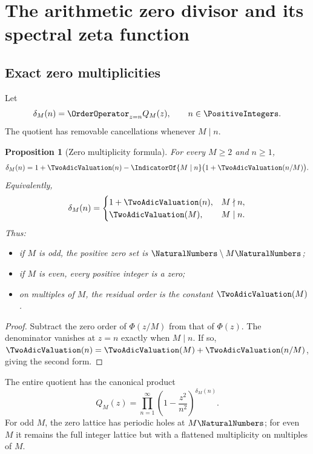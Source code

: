 \documentclass[11pt,oneside]{article}
\newtheorem{proposition}[theorem]{Proposition}
\theoremstyle{definition}
\theoremstyle{remark}
\begin{document}
\section{The arithmetic zero divisor and its spectral zeta function}
\label{sec:zeros}

\subsection{Exact zero multiplicities}

Let
\begin{equation}
 \delta_M(n)=\OrderOperator_{z=n}Q_M(z),
 \qquad n\in\PositiveIntegers.
 \label{eq:deltaM-def}
\end{equation}
The quotient has removable cancellations whenever $M\mid n$.

\begin{proposition}[Zero multiplicity formula]
\label{prop:zero-multiplicity}
For every $M\ge2$ and $n\ge1$,
\begin{equation}
 \delta_M(n)
 =1+\TwoAdicValuation(n)-\IndicatorOf{M\mid n}
 \bigl(1+\TwoAdicValuation(n/M)\bigr).
 \label{eq:deltaM-general}
\end{equation}
Equivalently,
\begin{equation}
 \delta_M(n)=
 \begin{cases}
 1+\TwoAdicValuation(n),&M\nmid n,\\
 \TwoAdicValuation(M),&M\mid n.
 \end{cases}
 \label{eq:deltaM-cases}
\end{equation}
Thus:
\begin{itemize}
\item if $M$ is odd, the positive zero set is $\NaturalNumbers\setminus M\NaturalNumbers$;
\item if $M$ is even, every positive integer is a zero;
\item on multiples of $M$, the residual order is the constant $\TwoAdicValuation(M)$.
\end{itemize}
\end{proposition}

\begin{proof}
Subtract the zero order of $\Phi(z/M)$ from that of $\Phi(z)$.  The denominator vanishes
at $z=n$ exactly when $M\mid n$.  If so,
$\TwoAdicValuation(n)=\TwoAdicValuation(M)+\TwoAdicValuation(n/M)$, giving the second form.
\end{proof}

The entire quotient has the canonical product
\begin{equation}
 Q_M(z)=\prod_{n=1}^{\infty}
 \left(1-\frac{z^2}{n^2}\right)^{\delta_M(n)}.
 \label{eq:QM-canonical}
\end{equation}
For odd $M$, the zero lattice has periodic holes at $M\NaturalNumbers$; for even $M$ it remains the
full integer lattice but with a flattened multiplicity on multiples of $M$.
\end{document}
